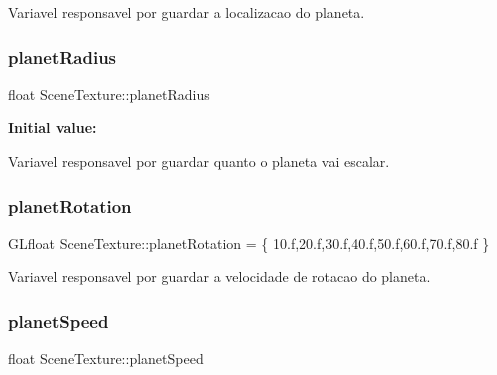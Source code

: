 Variavel responsavel por guardar a localizacao do planeta. 

\mbox{\label{class_scene_texture_a8a848a35ca146f5d75c66caf13a120ef}} 
\subsubsection{\texorpdfstring{planetRadius}{planetRadius}}
{\footnotesize\ttfamily float Scene\+Texture\+::planet\+Radius\hspace{0.3cm}{\ttfamily [static]}}

{\bfseries Initial value\+:}
\begin{DoxyCode}{0}
\DoxyCodeLine{= \{}
\DoxyCodeLine{\}}

\end{DoxyCode}


Variavel responsavel por guardar quanto o planeta vai escalar. 

\mbox{\label{class_scene_texture_af88e169aa03c2541615de23ece5c6d80}} 
\subsubsection{\texorpdfstring{planetRotation}{planetRotation}}
{\footnotesize\ttfamily G\+Lfloat Scene\+Texture\+::planet\+Rotation = \{ 10.f,20.f,30.f,40.f,50.f,60.f,70.f,80.f \}\hspace{0.3cm}{\ttfamily [static]}}



Variavel responsavel por guardar a velocidade de rotacao do planeta. 

\mbox{\label{class_scene_texture_a7d69f31178c4fa3ecc26a36201a1d2f9}} 
\subsubsection{\texorpdfstring{planetSpeed}{planetSpeed}}
{\footnotesize\ttfamily float Scene\+Texture\+::planet\+Speed\hspace{0.3cm}{\ttfamily [static]}}

